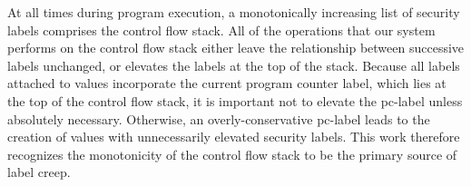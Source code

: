 At all times during program execution, a monotonically increasing list of security labels comprises the control flow stack.
All of the operations that our system performs on the control flow stack either leave the relationship between successive labels unchanged, or elevates the labels at the top of the stack.
Because all labels attached to values incorporate the current program counter label, which lies at the top of the control flow stack, it is important not to elevate the pc-label unless absolutely necessary.
Otherwise, an overly-conservative pc-label leads to the creation of values with unnecessarily elevated security labels.
This work therefore recognizes the monotonicity of the control flow stack to be the primary source of label creep.
